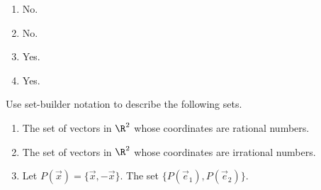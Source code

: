 \begin{exercises}
\begin{problist}
		\begin{solution}
            \begin{enumerate}
    		    \item No.
    		    \item No.
    		    \item Yes.
    		    \item Yes.
		    \end{enumerate}
		\end{solution}
		
		\prob
		    Use set-builder notation to describe the following sets.
		    \begin{enumerate}
		        \item The set of vectors in $\R^2$ whose coordinates are rational numbers.
		        \item The set of vectors in $\R^2$ whose coordinates are irrational numbers.
		        \item Let $P(\vec x) = \{\vec x, -\vec x\}$. The set $\{P(\vec e_1), P(\vec e_2)\}$.
		    \end{enumerate}
    		

\end{problist}
\end{exercises}
